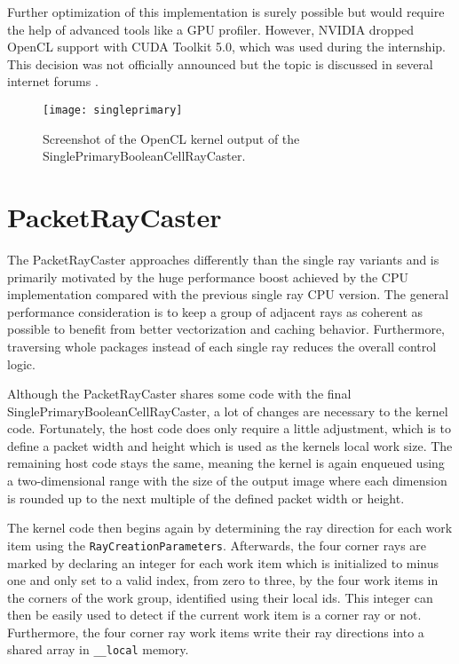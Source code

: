 Further optimization of this implementation is surely possible but would require the help of advanced tools like a GPU profiler. However, NVIDIA dropped OpenCL support with CUDA Toolkit 5.0, which was used during the internship. This decision was not officially announced but the topic is discussed in several internet forums \cite{dropped_opencl_support}.


\begin{figure}[h]
\centering
\texttt{[image: singleprimary]}
\caption{Screenshot of the OpenCL kernel output of the SinglePrimaryBooleanCellRayCaster.}
\label{fig:singleprimary}
\end{figure}

\section{PacketRayCaster}

The PacketRayCaster approaches differently than the single ray variants and is primarily motivated by the huge performance boost achieved by the CPU implementation compared with the previous single ray CPU version. The general performance consideration is to keep a group of adjacent rays as coherent as possible to benefit from better vectorization and caching behavior. Furthermore, traversing whole packages instead of each single ray reduces the overall control logic.

Although the PacketRayCaster shares some code with the final SinglePrimaryBooleanCellRayCaster, a lot of changes are necessary to the kernel code. Fortunately, the host code does only require a little adjustment, which is to define a packet width and height which is used as the kernels local work size. The remaining host code stays the same, meaning the kernel is again enqueued using a two-dimensional range with the size of the output image where each dimension is rounded up to the next multiple of the defined packet width or height.

The kernel code then begins again by determining the ray direction for each work item using the \lstinline!RayCreationParameters!. Afterwards, the four corner rays are marked by declaring an integer for each work item which is initialized to minus one and only set to a valid index, from zero to three, by the four work items in the corners of the work group, identified using their local ids. This integer can then be easily used to detect if the current work item is a corner ray or not. Furthermore, the four corner ray work items write their ray directions into a shared array in \lstinline!__local! memory.

